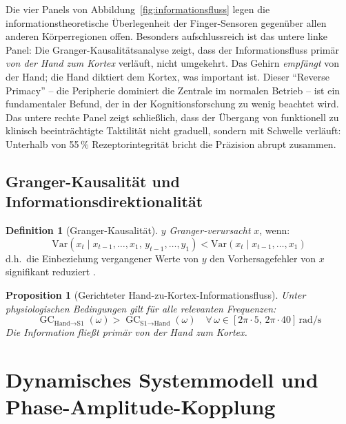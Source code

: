 ﻿\documentclass[12pt,a4paper]{report}
\theoremstyle{plain}
\newtheorem{proposition}[theorem]{Proposition}
\theoremstyle{definition}
\newtheorem{definition}[theorem]{Definition}
\theoremstyle{remark}
\DeclareMathOperator{\GC}{GC}
\begin{document}
Die vier Panels von Abbildung~\ref{fig:informationsfluss} legen die
informationstheoretische Überlegenheit der Finger-Sensoren gegenüber allen
anderen Körperregionen offen. Besonders aufschlussreich ist das untere linke
Panel: Die Granger-Kausalitätsanalyse zeigt, dass der Informationsfluss
primär \emph{von der Hand zum Kortex} verläuft, nicht umgekehrt. Das Gehirn
\emph{empfängt} von der Hand; die Hand diktiert dem Kortex, was important ist.
Dieser ``Reverse Primacy'' -- die Peripherie dominiert die Zentrale im
normalen Betrieb -- ist ein fundamentaler Befund, der in der Kognitionsforschung
zu wenig beachtet wird. Das untere rechte Panel zeigt schließlich, dass der
Übergang von funktionell zu klinisch beeinträchtigte Taktilität nicht
graduell, sondern mit Schwelle verläuft: Unterhalb von 55\,\% Rezeptorintegrität
bricht die Präzision abrupt zusammen.

\section{Granger-Kausalität und Informationsdirektionalität}

\begin{definition}[Granger-Kausalität]
$y$ \emph{Granger-verursacht} $x$, wenn:
\[
  \mathrm{Var}(x_t \mid x_{t-1},\ldots, x_1,\, y_{t-1},\ldots, y_1)
  < \mathrm{Var}(x_t \mid x_{t-1},\ldots, x_1)
\]
d.h.\ die Einbeziehung vergangener Werte von $y$ den Vorhersagefehler
von $x$ signifikant reduziert \cite{granger1969}.
\end{definition}

\begin{proposition}[Gerichteter Hand-zu-Kortex-Informationsfluss]
\label{prop:granger}
Unter physiologischen Bedingungen gilt für alle relevanten Frequenzen:
\[
  \GC_{\text{Hand} \to \text{S1}}(\omega)
  > \GC_{\text{S1} \to \text{Hand}}(\omega)
  \quad \forall\,\omega \in [2\pi \cdot 5,\, 2\pi \cdot 40]\,\mathrm{rad/s}
\]
Die Information fließt primär von der Hand zum Kortex.
\end{proposition}

\chapter{Dynamisches Systemmodell und Phase-Amplitude-Kopplung}
\label{chap:systemmodell}
\end{document}
